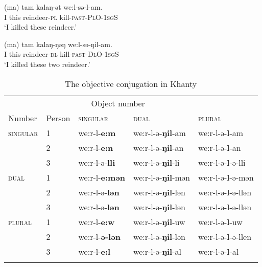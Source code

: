 \documentclass[output=paper
,modfonts
,nonflat]{langsci/langscibook}
\begin{document}
\begin{exe}
\ex \citet[][142--143]{dn2011}
\begin{xlist}
\ex
{\gll (ma) tam kalaŋ-ət we:l-sə-l-am.\\
I this reindeer-\textsc{pl} kill-\textsc{past-PlO-1sgS}\\
\glt `I killed these reindeer.'}

\ex
{\gll (ma) tam kalaŋ-ŋəŋ we:l-sə-ŋil-am.\\
I this reindeer-\textsc{dl} kill-\textsc{past-DlO-1sgS}\\
\glt `I killed these two reindeer.'}

\end{xlist}
\end{exe} 

\begin{table}
\caption{\label{tab:objconj}The objective conjugation in Khanty \parencite{ostyakgrammar}}
\begin{tabular}{l  l  l l l}
\lsptoprule
\multicolumn{2}{c}{Subject}	&	\multicolumn{3}{c}{Object number}\\\cmidrule(lr){1-2}\cmidrule(lr){3-5}
Number		&	Person		&	\textsc{singular}				&	\textsc{dual}							&	\textsc{plural}\\
\midrule
\textsc{singular}	&	1		&	we:r-l-{\bf e:m}					&	we:r-l-ə-{\bf ŋil}-am			&	we:r-l-ə-{\bf l}-am\\
			&	2		&	we:r-l-{\bf e:n}					&	we:r-l-ə-{\bf ŋil}-an			&	we:r-l-ə-{\bf l}-an\\
			&	3		&	we:r-l-ə-{\bf lli}			&	we:r-l-ə-{\bf ŋil}-li			&	we:r-l-ə-{\bf l}-ə-lli\\
\textsc{dual}	&	1		&	we:r-l-{\bf e:mən}			&	we:r-l-ə-{\bf ŋil}-mən	&	we:r-l-ə-{\bf l}-ə-mən\\
			&	2		&	we:r-l-ə-{\bf lən}		&	we:r-l-ə-{\bf ŋil}-lən	&	we:r-l-ə-{\bf l}-ə-llən\\
			&	3		&	we:r-l-ə-{\bf lən}		&	we:r-l-ə-{\bf ŋil}-lən	&	we:r-l-ə-{\bf l}-ə-llən\\
\textsc{plural}	&	1		&	we:r-l-{\bf e:w}					&	we:r-l-ə-{\bf ŋil}-uw			&	we:r-l-ə-{\bf l}-uw\\
			&	2		&	we:r-l-{\bf ə-lən}		&	we:r-l-ə-{\bf ŋil}-lən	&	we:r-l-ə-{\bf l}-ə-llen\\
			&	3		&	we:r-l-{\bf e:l}					&	we:r-l-ə-{\bf ŋil}-al			&	we:r-l-ə-{\bf l}-al\\
\lspbottomrule
\end{tabular}

\end{table}
\end{document}
